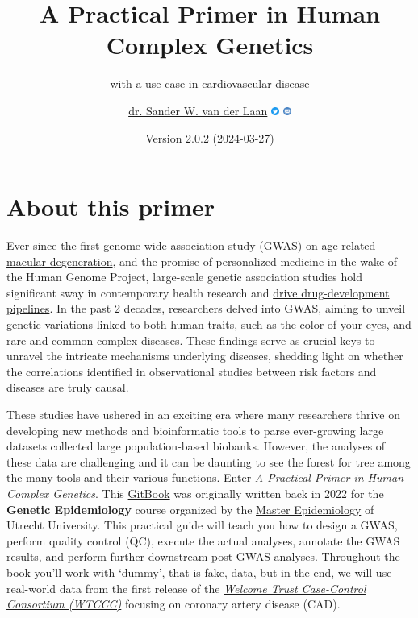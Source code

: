\documentclass[
]{book}
\title{A Practical Primer in Human Complex Genetics}
\subtitle{with a use-case in cardiovascular disease}
\author{\href{https://vanderlaanand.science}{dr. Sander W. van der Laan} \href{https://www.twitter.com/swvanderlaan}{\includegraphics[width=0.02\textwidth,height=\textheight]{./img/_logo/twitter_circle_blue.png}} \href{mailto:s.w.vanderlaan@gmail.com}{\includegraphics[width=0.02\textwidth,height=\textheight]{./img/_logo/email_circle_blue.png}}}
\date{Version 2.0.2 (2024-03-27)}
\begin{document}
\maketitle

{
\setcounter{tocdepth}{1}
\tableofcontents
}
\hypertarget{about-this-primer}{%
\chapter{About this primer}\label{about-this-primer}}

Ever since the first genome-wide association study (GWAS) on \href{https://doi.org/10.1126/science.1109557}{age-related macular degeneration}, and the promise of personalized medicine in the wake of the Human Genome Project, large-scale genetic association studies hold significant sway in contemporary health research and \href{http://dx.doi.org/10.1038/nrd.2017.262}{drive drug-development pipelines}. In the past 2 decades, researchers delved into GWAS, aiming to unveil genetic variations linked to both human traits, such as the color of your eyes, and rare and common complex diseases. These findings serve as crucial keys to unravel the intricate mechanisms underlying diseases, shedding light on whether the correlations identified in observational studies between risk factors and diseases are truly causal.

These studies have ushered in an exciting era where many researchers thrive on developing new methods and bioinformatic tools to parse ever-growing large datasets collected large population-based biobanks. However, the analyses of these data are challenging and it can be daunting to see the forest for tree among the many tools and their various functions. Enter \emph{A Practical Primer in Human Complex Genetics}. This \href{https://cjvanlissa.github.io/gitbook-demo/}{GitBook} was originally written back in 2022 for the \textbf{Genetic Epidemiology} course organized by the \href{https://epidemiology-education.nl}{Master Epidemiology} of Utrecht University. This practical guide will teach you how to design a GWAS, perform quality control (QC), execute the actual analyses, annotate the GWAS results, and perform further downstream post-GWAS analyses. Throughout the book you'll work with `dummy', that is fake, data, but in the end, we will use real-world data from the first release of the \href{https://www.wtccc.org.uk/ccc1/overview.html}{\emph{Welcome Trust Case-Control Consortium (WTCCC)}} focusing on coronary artery disease (CAD).
\end{document}
